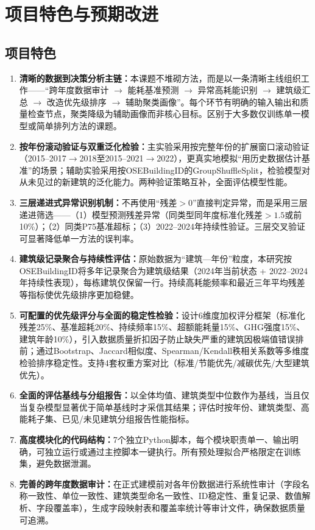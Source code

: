 \section{项目特色与预期改进}

\subsection{项目特色}

\begin{enumerate}
    \item \textbf{清晰的数据到决策分析主链：}本课题不堆砌方法，而是以一条清晰主线组织工作——``跨年度数据审计 $\rightarrow$ 能耗基准预测 $\rightarrow$ 异常高耗能识别 $\rightarrow$ 建筑级汇总 $\rightarrow$ 改造优先级排序 $\rightarrow$ 辅助聚类画像''。每个环节有明确的输入输出和质量检查节点，聚类降级为辅助画像而非核心目标。区别于大多数仅训练单一模型或简单排列方法的课题。

    \item \textbf{按年份滚动验证与双重泛化检验：}主实验采用按完整年份的扩展窗口滚动验证（2015--2017$\rightarrow$2018至2015--2021$\rightarrow$2022），更真实地模拟``用历史数据估计基准''的场景；辅助实验采用按OSEBuildingID的GroupShuffleSplit，检验模型对从未见过的新建筑的泛化能力。两种验证策略互补，全面评估模型性能。

    \item \textbf{三层递进式异常识别机制：}不再使用``残差$>0$''直接判定异常，而是采用三层递进筛选——（1）模型预测残差异常（同类型同年度标准化残差$>1.5$或前10\%）；（2）同类P75基准超标；（3）2022--2024年持续性验证。三层交叉验证可显著降低单一方法的误判率。

    \item \textbf{建筑级记录聚合与持续性评估：}原始数据为``建筑—年份''粒度，本研究按OSEBuildingID将多年记录聚合为建筑级结果（2024年当前状态 + 2022--2024年持续性表现），每栋建筑仅保留一行。持续高耗能频率和最近三年平均残差等指标使优先级排序更加稳健。

    \item \textbf{可配置的优先级评分与全面的稳定性检验：}设计6维度加权评分框架（标准化残差25\%、基准超耗20\%、持续频率15\%、超额能耗量15\%、GHG强度15\%、建筑年龄10\%），引入数据质量折扣因子防止缺失严重的建筑因极端值错误排前；通过Bootstrap、Jaccard相似度、Spearman/Kendall秩相关系数等多维度检验排序稳定性。支持4套权重方案对比（标准/节能优先/减碳优先/大型建筑优先）。

    \item \textbf{全面的评估基线与分组报告：}以全体均值、建筑类型中位数作为基线，当且仅当复杂模型显著优于简单基线时才采信其结果；评估时按年份、建筑类型、高能耗子集、已见/未见建筑分组报告性能指标。

    \item \textbf{高度模块化的代码结构：}7个独立Python脚本，每个模块职责单一、输出明确，可独立运行或通过主控脚本一键执行。所有预处理拟合严格限定在训练集，避免数据泄漏。

    \item \textbf{完善的跨年度数据审计：}在正式建模前对各年份数据进行系统性审计（字段名称一致性、单位一致性、建筑类型命名一致性、ID稳定性、重复记录、数值解析、字段覆盖率），生成字段映射表和覆盖率统计等审计文件，确保数据质量可追溯。
\end{enumerate}

